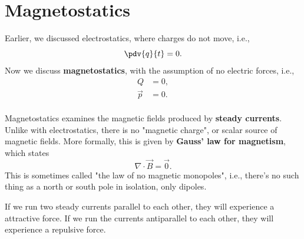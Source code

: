 \chapter{Magnetostatics}

Earlier, we discussed electrostatics, where charges do not move, i.e.,
\begin{equation}
    \pdv{q}{t} = 0.
\end{equation}
Now we discuss \textbf{magnetostatics},
with the assumption of no electric forces, i.e.,
\begin{equation}
    \begin{aligned}
        Q &= 0, \\
        \vec{p} &= 0. \\
    \end{aligned}
\end{equation}

Magnetostatics examines the magnetic fields
produced by \textbf{steady currents}.
Unlike with electrostatics, there is no "magnetic charge",
or scalar source of magnetic fields.
More formally, this is given by \textbf{Gauss' law for magnetism}, which states
\begin{equation}
    \nabla \cdot \vec{B} = \vec{0}.
\end{equation}
This is sometimes called "the law of no magnetic monopoles",
i.e., there's no such thing as a north or south pole in isolation, only dipoles.

If we run two steady currents parallel to each other,
they will experience a attractive force.
If we run the currents antiparallel to each other,
they will experience a repulsive force.
